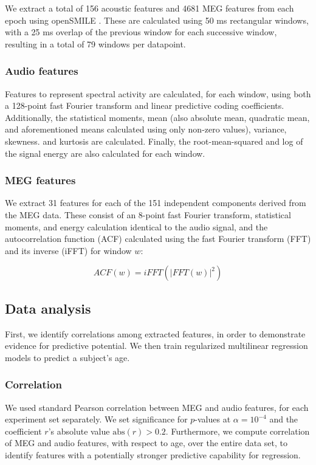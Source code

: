 \documentclass[a4paper]{article}
\begin{document}
We extract a total of 156 acoustic features and 4681 MEG features from each epoch using openSMILE \cite{Eyben13-RDI}. These are calculated using 50 ms rectangular windows, with a 25 ms overlap of the previous window for each successive window, resulting in a total of 79 windows per datapoint.

\subsubsection{Audio features}

Features to represent spectral activity are calculated, for each window, using both a 128-point fast Fourier transform and linear predictive coding coefficients. Additionally, the statistical moments, mean (also absolute mean, quadratic mean, and aforementioned means calculated using only non-zero values), variance, skewness. and kurtosis are calculated. Finally, the root-mean-squared and log of the signal energy are also calculated for each window.

\subsubsection{MEG features}

We extract 31 features for each of the 151 independent components derived from the MEG data. These consist of an 8-point fast Fourier transform, statistical moments, and energy calculation identical to the audio signal, and the autocorrelation function (ACF) calculated using the fast Fourier transform (FFT) and its inverse (iFFT) for window $w$:

\begin{equation}
  ACF(w) = iFFT(|FFT(w)|^2)
  \label{eq1}
\end{equation}

\subsection{Data analysis}

First, we identify correlations among extracted features, in order to demonstrate evidence for predictive potential. We then train regularized multilinear regression models to predict a subject's age.

\subsubsection{Correlation}

We used standard Pearson correlation between MEG and audio features, for each experiment set separately. We set significance for $p$-values at $\alpha = 10^{-4}$ and the coefficient $r$'s absolute value $\text{abs}(r) > 0.2$.  Furthermore, we compute correlation of MEG and audio features, with respect to age, over the entire data set, to identify features with a potentially stronger predictive capability for regression.
\end{document}
